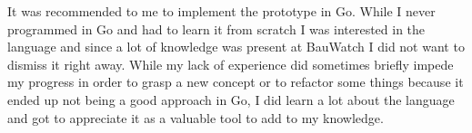 It was recommended to me to implement the prototype in Go.
While I never programmed in Go and had to learn it from scratch I was interested in the language and since a lot of knowledge was present at BauWatch I did not want to dismiss it right away.
While my lack of experience did sometimes briefly impede my progress in order to grasp a new concept or to refactor some things because it ended up not being a good approach in Go, I did learn a lot about the language and got to appreciate it as a valuable tool to add to my knowledge.

